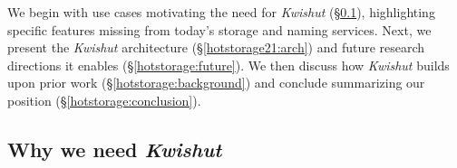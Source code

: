 We begin with use cases motivating the need for \emph{Kwishut} (\S\ref{hotstorage:use-cases}), highlighting specific features missing from today's storage and naming services. Next, we present the \emph{Kwishut} architecture (\S\ref{hotstorage21:arch}) and future research directions it enables (\S\ref{hotstorage:future}).
We then discuss how \emph{Kwishut} builds upon prior work
(\S\ref{hotstorage:background}) and conclude summarizing our position (\S\ref{hotstorage:conclusion}).

\subsection{Why we need \emph{Kwishut}}
\label{hotstorage:use-cases}

